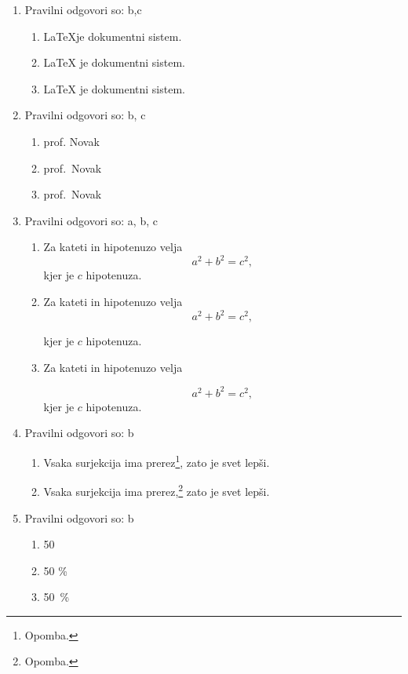 \documentclass[11pt]{article}
\begin{document}
\begin{enumerate}
    \item Pravilni odgovori so: b,c %
    \begin{enumerate}
        \item \LaTeX je dokumentni sistem.
        \item {\LaTeX} je dokumentni sistem.
        \item \LaTeX{} je dokumentni sistem.
    \end{enumerate}

    \item Pravilni odgovori so: b, c%
    \begin{enumerate}
        \item prof. Novak
        \item prof.~Novak
        \item prof.\ Novak
    \end{enumerate}

    \item Pravilni odgovori so: a, b, c%
    \begin{enumerate}
        \item
Za kateti in hipotenuzo velja
\[
  a^2 + b^2 = c^2,
\]
kjer je \(c\) hipotenuza.
        \item
Za kateti in hipotenuzo velja
\[
  a^2 + b^2 = c^2,
\]

kjer je \(c\) hipotenuza.
        \item
Za kateti in hipotenuzo velja

\[
  a^2 + b^2 = c^2,
\]
kjer je \(c\) hipotenuza.
    \end{enumerate}

    \item Pravilni odgovori so: b %
    \begin{enumerate}
        \item Vsaka surjekcija ima prerez\footnote{Opomba.}, zato je svet lepši.
        \item Vsaka surjekcija ima prerez,\footnote{Opomba.} zato je svet lepši.
    \end{enumerate}

    \item Pravilni odgovori so: b %
    \begin{enumerate}
        \item 50 %
        \item 50 \%
        \item 50~\%
    \end{enumerate}


\end{enumerate}
\end{document}
